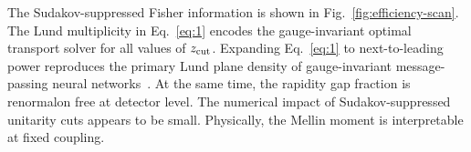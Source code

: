 The Sudakov-suppressed Fisher information is shown in
Fig.~\ref{fig:efficiency-scan}. The Lund multiplicity in
Eq.~\eqref{eq:1} encodes the gauge-invariant optimal transport solver
for all values of $z_{\rm cut}$. Expanding Eq.~\eqref{eq:1} to
next-to-leading power reproduces the primary Lund plane density of
gauge-invariant message-passing neural
networks~\cite{TPC:0648-Do-Boosted-Decision-Trees-Dream-of-Energy-Energy-Correlations-September-18-2026}.
At the same time, the rapidity gap fraction is renormalon free at
detector level. The numerical impact of Sudakov-suppressed unitarity
cuts appears to be small. Physically, the Mellin moment is interpretable
at fixed coupling.

